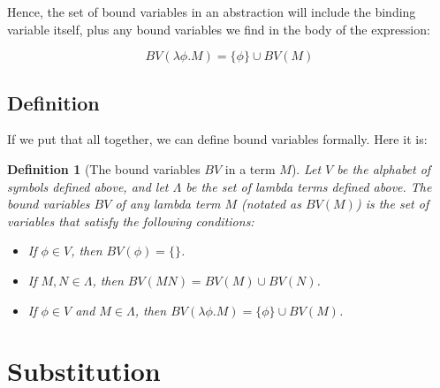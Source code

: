 \documentclass{book}
\numberwithin{equation}{chapter}
\newtheorem{definition}{Definition}
\begin{document}
Hence, the set of bound variables in an abstraction will include the binding variable itself, plus any bound variables we find in the body of the expression:

\begin{equation}
BV(\lambda \phi.M) = \{ \phi \} \cup BV(M)
\end{equation}


\section{Definition}

If we put that all together, we can define bound variables formally. Here it is:

\begin{definition}[The bound variables $BV$ in a term $M$]
Let $V$ be the alphabet of symbols defined above, and let $\Lambda$ be the set of lambda terms defined above. The bound variables $BV$ of any lambda term $M$ (notated as $BV(M)$) is the set of variables that satisfy the following conditions:

\begin{itemize}

\item{If $\phi \in V$, then $BV(\phi) = \{\}$.}
\item{If $M, N \in \Lambda$, then $BV(M N) = BV(M) \cup BV(N)$.}
\item{If $\phi \in V$ and $M \in \Lambda$, then $BV(\lambda \phi.M) = \{ \phi \} \cup BV(M)$.}

\end{itemize}

\end{definition}



\chapter{Substitution}
\end{document}
